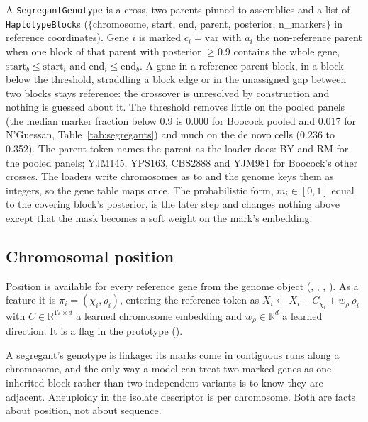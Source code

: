  A \texttt{SegregantGenotype} is a
cross, two parents pinned to assemblies and a list of \texttt{HaplotypeBlock}s
($\{$chromosome, start, end, parent, posterior, n\_markers$\}$ in reference
coordinates). Gene $i$ is marked $c_i=\mathrm{var}$ with $a_i$ the non-reference parent
when one block of that parent with posterior $\geq 0.9$ contains the whole gene,
$\mathrm{start}_b\leq\mathrm{start}_i$ and $\mathrm{end}_i\leq\mathrm{end}_b$. A gene in
a reference-parent block, in a block below the threshold, straddling a block edge or in
the unassigned gap between two blocks stays reference: the crossover is unresolved by
construction and nothing is guessed about it. The threshold removes little on the
pooled panels (the median marker fraction below 0.9 is 0.000 for Boocock pooled and
0.017 for N'Guessan, Table~\ref{tab:segregants}) and much on the de novo cells (0.236
to 0.352). The parent token names the parent as the loader does: BY and RM for the
pooled panels; YJM145, YPS163, CBS2888 and YJM981 for Boocock's other crosses. The
loaders write chromosomes as  to  and the genome keys them as
integers, so the gene table maps once. The probabilistic form, $m_i\in[0,1]$ equal to
the covering block's posterior, is the later step and changes nothing above except that
the mask becomes a soft weight on the mark's embedding.

\subsection{Chromosomal position}
\label{sec:input-position}

Position is available for every reference gene from the genome object
(, , , ).
As a feature it is $\pi_i=(\chi_i,\rho_i)$, entering the reference token as
$X_i\leftarrow X_i+C_{\chi_i}+w_\rho\,\rho_i$ with $C\in\mathbb{R}^{17\times d}$ a learned
chromosome embedding and $w_\rho\in\mathbb{R}^d$ a learned direction. It is a flag in the
prototype ().

 A segregant's genotype is linkage: its marks come in
contiguous runs along a chromosome, and the only way a model can treat two marked genes
as one inherited block rather than two independent variants is to know they are
adjacent. Aneuploidy in the isolate descriptor is per chromosome. Both are facts about
position, not about sequence.

